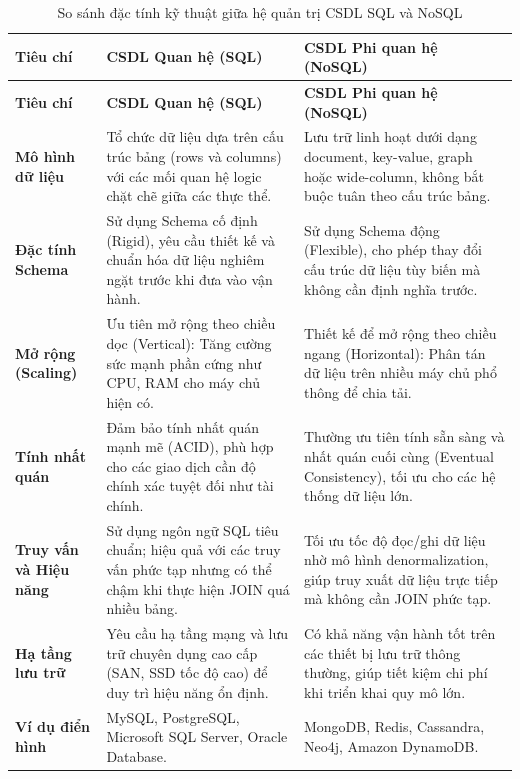 \begin{longtable}{|p{}|p{}|p{}|}
\caption{So sánh đặc tính kỹ thuật giữa hệ quản trị CSDL SQL và NoSQL}\label{tab:sql_vs_nosql}\\
\hline
\textbf{Tiêu chí} & \textbf{CSDL Quan hệ (SQL)} & \textbf{CSDL Phi quan hệ (NoSQL)} \\ \hline
\endfirsthead

\hline
\textbf{Tiêu chí} & \textbf{CSDL Quan hệ (SQL)} & \textbf{CSDL Phi quan hệ (NoSQL)} \\ \hline
\endhead

\hline
\endfoot

\endlastfoot

\textbf{Mô hình dữ liệu} 
& Tổ chức dữ liệu dựa trên cấu trúc bảng (rows và columns) với các mối quan hệ logic chặt chẽ giữa các thực thể.
& Lưu trữ linh hoạt dưới dạng document, key-value, graph hoặc wide-column, không bắt buộc tuân theo cấu trúc bảng. \\ \hline

\textbf{Đặc tính Schema} 
& Sử dụng Schema cố định (Rigid), yêu cầu thiết kế và chuẩn hóa dữ liệu nghiêm ngặt trước khi đưa vào vận hành.
& Sử dụng Schema động (Flexible), cho phép thay đổi cấu trúc dữ liệu tùy biến mà không cần định nghĩa trước. \\ \hline

\textbf{Mở rộng (Scaling)} 
& Ưu tiên mở rộng theo chiều dọc (Vertical): Tăng cường sức mạnh phần cứng như CPU, RAM cho máy chủ hiện có.
& Thiết kế để mở rộng theo chiều ngang (Horizontal): Phân tán dữ liệu trên nhiều máy chủ phổ thông để chia tải. \\ \hline

\textbf{Tính nhất quán} 
& Đảm bảo tính nhất quán mạnh mẽ (ACID), phù hợp cho các giao dịch cần độ chính xác tuyệt đối như tài chính.
& Thường ưu tiên tính sẵn sàng và nhất quán cuối cùng (Eventual Consistency), tối ưu cho các hệ thống dữ liệu lớn. \\ \hline

\textbf{Truy vấn và Hiệu năng} 
& Sử dụng ngôn ngữ SQL tiêu chuẩn; hiệu quả với các truy vấn phức tạp nhưng có thể chậm khi thực hiện JOIN quá nhiều bảng.
& Tối ưu tốc độ đọc/ghi dữ liệu nhờ mô hình denormalization, giúp truy xuất dữ liệu trực tiếp mà không cần JOIN phức tạp. \\ \hline

\textbf{Hạ tầng lưu trữ} 
& Yêu cầu hạ tầng mạng và lưu trữ chuyên dụng cao cấp (SAN, SSD tốc độ cao) để duy trì hiệu năng ổn định.
& Có khả năng vận hành tốt trên các thiết bị lưu trữ thông thường, giúp tiết kiệm chi phí khi triển khai quy mô lớn. \\ \hline

\textbf{Ví dụ điển hình} 
& MySQL, PostgreSQL, Microsoft SQL Server, Oracle Database.
& MongoDB, Redis, Cassandra, Neo4j, Amazon DynamoDB. \\ \hline
\end{longtable}
